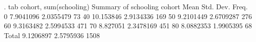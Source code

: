 . tab cohort, sum(schooling)
{\smallskip}
            {\VBAR}        Summary of schooling
     cohort {\VBAR}        Mean   Std. Dev.       Freq.
          0 {\VBAR}   7.9041096   2.0355479          73
         40 {\VBAR}   10.153846   2.9134336         169
         50 {\VBAR}   9.2101449   2.6709287         276
         60 {\VBAR}   9.3163482   2.5994533         471
         70 {\VBAR}    8.827051   2.3478169         451
         80 {\VBAR}   8.0882353   1.9905395          68
      Total {\VBAR}   9.1206897   2.5795936        1508
{\smallskip}
